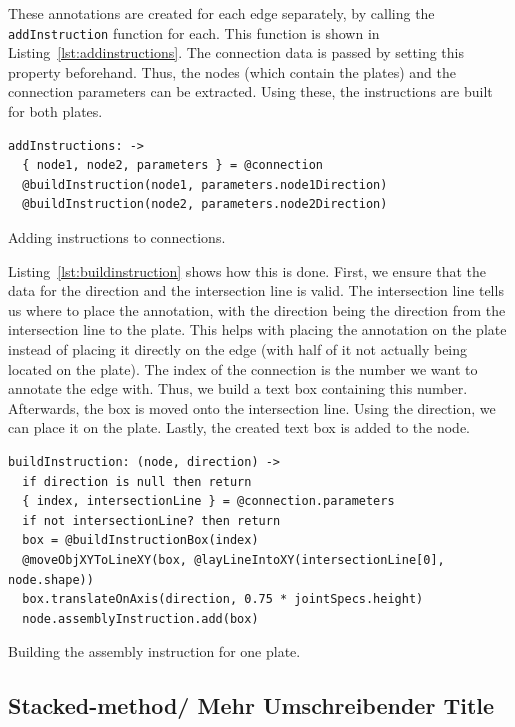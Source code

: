 \documentclass[../ClassicThesis.tex]{subfiles}
\begin{document}
These annotations are created for each edge separately, by calling the \texttt{addInstruction} function for each. This function is shown in Listing~\ref{lst:addinstructions}. The connection data is passed by setting this property beforehand. Thus, the nodes (which contain the plates) and the connection parameters can be extracted. Using these, the instructions are built for both plates.

\begin{listing}
\begin{verbatim}
addInstructions: ->
  { node1, node2, parameters } = @connection
  @buildInstruction(node1, parameters.node1Direction)
  @buildInstruction(node2, parameters.node2Direction)
\end{verbatim}
\caption{Adding instructions to connections.}
\label{lst:addinstructions}
\end{listing}

Listing~\ref{lst:buildinstruction} shows how this is done. First, we ensure that the data for the direction and the intersection line is valid. The intersection line tells us where to place the annotation, with the direction being the direction from the intersection line to the plate. This helps with placing the annotation on the plate instead of placing it directly on the edge (with half of it not actually being located on the plate). The index of the connection is the number we want to annotate the edge with. Thus, we build a text box containing this number. Afterwards, the box is moved onto the intersection line. Using the direction, we can place it on the plate. Lastly, the created text box is added to the node.

\begin{listing}
\begin{verbatim}
buildInstruction: (node, direction) ->
  if direction is null then return
  { index, intersectionLine } = @connection.parameters
  if not intersectionLine? then return 
  box = @buildInstructionBox(index)
  @moveObjXYToLineXY(box, @layLineIntoXY(intersectionLine[0], node.shape))
  box.translateOnAxis(direction, 0.75 * jointSpecs.height)
  node.assemblyInstruction.add(box)
\end{verbatim}
\caption{Building the assembly instruction for one plate.}
\label{lst:buildinstruction}
\end{listing}

\subsection{Stacked-method/ Mehr Umschreibender Title}\label{sub:assemblystacked}
\end{document}
